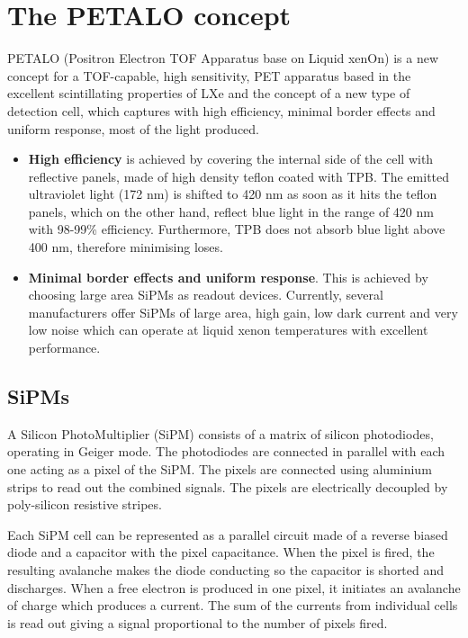 \documentclass{JINST}
\begin{document}
\section{The PETALO concept}
\label{sec.petalo}

PETALO (Positron Electron TOF Apparatus base on Liquid xenOn) is a new concept for a TOF-capable, high sensitivity, PET apparatus based in the excellent scintillating properties of LXe and the concept of a new type of detection cell, which captures with high efficiency, minimal border effects and uniform response, most of the light produced.
 
\begin{itemize} 
\item {\bf High efficiency} is achieved by covering the internal side of the cell with reflective panels, made of high density teflon coated with TPB. The emitted ultraviolet light (172 nm) is shifted to 420 nm as soon as it hits the teflon panels, which on the other hand, reflect blue light in the range of 420 nm with 98-99\% efficiency. Furthermore, TPB does not absorb blue light above 400 nm, therefore minimising loses. 
\item {\bf Minimal border effects and uniform response}. This is achieved by choosing large area SiPMs as readout devices. Currently, several manufacturers offer SiPMs of large area, high gain, low dark current and very low noise which can operate at liquid xenon temperatures with excellent performance.  
\end{itemize} 

\subsection{SiPMs}

A Silicon PhotoMultiplier (SiPM) consists of a matrix of silicon photodiodes, operating in Geiger mode. The photodiodes are connected in parallel with each one acting as a pixel of the SiPM. The pixels are connected using aluminium strips to read out the combined signals. The pixels are electrically decoupled by poly-silicon resistive stripes.

Each SiPM cell can be represented as a parallel circuit made of a reverse biased diode and a capacitor with the pixel capacitance. When the pixel is fired, the resulting avalanche makes the diode conducting so the capacitor is shorted and discharges.
When a free electron is produced in one pixel, it initiates an avalanche of charge which produces a current. The sum of the currents from individual cells is read out giving a signal proportional to the number of pixels fired.
\end{document}
